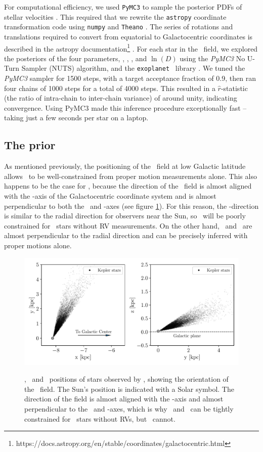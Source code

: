 For computational efficiency, we used {\tt PyMC3} to sample the posterior PDFs
of stellar velocities \citep{pymc3}.
This required that we rewrite the {\tt astropy} coordinate transformation code
using {\tt numpy} and {\tt Theano} \citep{numpy, theano}.
The series of rotations and translations required to convert from equatorial
to Galactocentric coordinates is described in the astropy
documentation\footnote{
    https://docs.astropy.org/en/stable/coordinates/galactocentric.html }
\citep{astropy2018}.
For each star in the \kepler\ field, we explored the posteriors of the four
parameters, \vx, \vy, \vz, and $\ln(D)$ using the {\it PyMC3} No U-Turn
Sampler (NUTS) algorithm, and the {\tt exoplanet} \python\ library
\citep{exoplanet}.
We tuned the {\it PyMC3} sampler for 1500 steps, with a target acceptance
fraction of 0.9, then ran four chains of 1000 steps for a total of 4000 steps.
This resulted in a $\hat{r}$-statistic (the ratio of intra-chain to
inter-chain variance) of around unity, indicating convergence.
Using PyMC3 made this inference procedure exceptionally fast -- taking just a
few seconds per star on a laptop.

\subsection{The prior}
\label{sec:prior}

As mentioned previously, the positioning of the \kepler\ field at low Galactic
latitude allows \vz\ to be well-constrained from proper motion measurements
alone.
This also happens to be the case for \vx, because the direction of the
\kepler\ field is almost aligned with the \y-axis of the Galactocentric
coordinate system and is almost perpendicular to both the \x\ and \z-axes (see
figure \ref{fig:kepler_field}).
For this reason, the \y-direction is similar to the radial direction for
observers near the Sun, so \vy\ will be poorly constrained for \kepler\ stars
without RV measurements.
On the other hand, \vx\ and \vz\ are almost perpendicular to the radial
direction and can be precisely inferred with proper motions alone.
\begin{figure}[ht!]
\caption{
\x, \y\ and \z\ positions of stars observed by \kepler, showing the
    orientation of the \kepler\ field.
The Sun's position is indicated with a Solar symbol.
The direction of the field is almost aligned with the \y-axis and almost
    perpendicular to the \x\ and \z-axes, which is why \vx\ and \vz\ can be
    tightly constrained for \kepler\ stars without RVs, but \vy\ cannot.
}
  \centering
    \includegraphics[width=.7\textwidth]{kepler_field}
\label{fig:kepler_field}
\end{figure}

